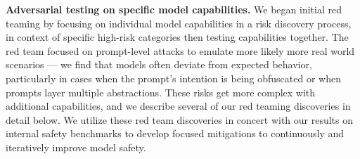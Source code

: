\documentclass[dvipsnames]{fairmeta}
\begin{document}
\textbf{Adversarial testing on specific model capabilities.}
We began initial red teaming by focusing on individual model capabilities in a risk discovery process, in context of specific high-risk categories then testing capabilities together. 
The red team focused on prompt-level attacks to emulate more likely more real world scenarios --- we find that models often deviate from expected behavior, particularly in cases when the prompt's intention is being obfuscated or when prompts layer multiple abstractions.
These risks get more complex with additional capabilities, and we describe several of our red teaming discoveries in detail below.
We utilize these red team discoveries in concert with our results on internal safety benchmarks to develop focused mitigations to continuously and iteratively improve model safety.
\end{document}
